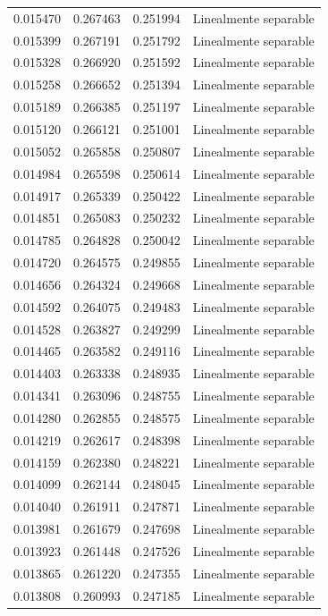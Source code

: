 \begin{tabular}{llll}
0.015470 & 0.267463 & 0.251994 & Linealmente separable \\
0.015399 & 0.267191 & 0.251792 & Linealmente separable \\
0.015328 & 0.266920 & 0.251592 & Linealmente separable \\
0.015258 & 0.266652 & 0.251394 & Linealmente separable \\
0.015189 & 0.266385 & 0.251197 & Linealmente separable \\
0.015120 & 0.266121 & 0.251001 & Linealmente separable \\
0.015052 & 0.265858 & 0.250807 & Linealmente separable \\
0.014984 & 0.265598 & 0.250614 & Linealmente separable \\
0.014917 & 0.265339 & 0.250422 & Linealmente separable \\
0.014851 & 0.265083 & 0.250232 & Linealmente separable \\
0.014785 & 0.264828 & 0.250042 & Linealmente separable \\
0.014720 & 0.264575 & 0.249855 & Linealmente separable \\
0.014656 & 0.264324 & 0.249668 & Linealmente separable \\
0.014592 & 0.264075 & 0.249483 & Linealmente separable \\
0.014528 & 0.263827 & 0.249299 & Linealmente separable \\
0.014465 & 0.263582 & 0.249116 & Linealmente separable \\
0.014403 & 0.263338 & 0.248935 & Linealmente separable \\
0.014341 & 0.263096 & 0.248755 & Linealmente separable \\
0.014280 & 0.262855 & 0.248575 & Linealmente separable \\
0.014219 & 0.262617 & 0.248398 & Linealmente separable \\
0.014159 & 0.262380 & 0.248221 & Linealmente separable \\
0.014099 & 0.262144 & 0.248045 & Linealmente separable \\
0.014040 & 0.261911 & 0.247871 & Linealmente separable \\
0.013981 & 0.261679 & 0.247698 & Linealmente separable \\
0.013923 & 0.261448 & 0.247526 & Linealmente separable \\
0.013865 & 0.261220 & 0.247355 & Linealmente separable \\
0.013808 & 0.260993 & 0.247185 & Linealmente separable \\

\end{tabular}
